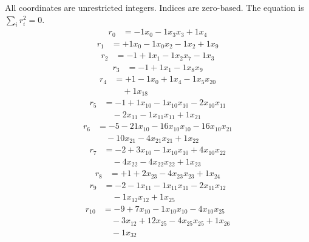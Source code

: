 \begingroup\small
All coordinates are unrestricted integers. Indices are zero-based. The equation is $\sum_i r_i^2=0$.
\[\begin{aligned}
r_{0} &= - 1 x_{0} - 1 x_{3} x_{3} + 1 x_{4}
\end{aligned}\]
\[\begin{aligned}
r_{1} &= + 1 x_{0} - 1 x_{0} x_{2} - 1 x_{2} + 1 x_{9}
\end{aligned}\]
\[\begin{aligned}
r_{2} &= - 1 + 1 x_{1} - 1 x_{2} x_{7} - 1 x_{3}
\end{aligned}\]
\[\begin{aligned}
r_{3} &= - 1 + 1 x_{1} - 1 x_{8} x_{9}
\end{aligned}\]
\[\begin{aligned}
r_{4} &= + 1 - 1 x_{0} + 1 x_{4} - 1 x_{5} x_{20} \\
 &\quad + 1 x_{18}
\end{aligned}\]
\[\begin{aligned}
r_{5} &= - 1 + 1 x_{10} - 1 x_{10} x_{10} - 2 x_{10} x_{11} \\
 &\quad - 2 x_{11} - 1 x_{11} x_{11} + 1 x_{21}
\end{aligned}\]
\[\begin{aligned}
r_{6} &= - 5 - 21 x_{10} - 16 x_{10} x_{10} - 16 x_{10} x_{21} \\
 &\quad - 10 x_{21} - 4 x_{21} x_{21} + 1 x_{22}
\end{aligned}\]
\[\begin{aligned}
r_{7} &= - 2 + 3 x_{10} - 1 x_{10} x_{10} + 4 x_{10} x_{22} \\
 &\quad - 4 x_{22} - 4 x_{22} x_{22} + 1 x_{23}
\end{aligned}\]
\[\begin{aligned}
r_{8} &= + 1 + 2 x_{23} - 4 x_{23} x_{23} + 1 x_{24}
\end{aligned}\]
\[\begin{aligned}
r_{9} &= - 2 - 1 x_{11} - 1 x_{11} x_{11} - 2 x_{11} x_{12} \\
 &\quad - 1 x_{12} x_{12} + 1 x_{25}
\end{aligned}\]
\[\begin{aligned}
r_{10} &= - 9 + 7 x_{10} - 1 x_{10} x_{10} - 4 x_{10} x_{25} \\
 &\quad - 3 x_{12} + 12 x_{25} - 4 x_{25} x_{25} + 1 x_{26} \\
 &\quad - 1 x_{32}
\end{aligned}\]
